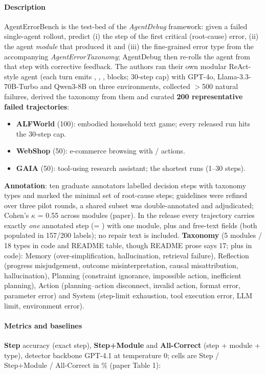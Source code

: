 \paragraph{Description} AgentErrorBench is the test-bed of the \emph{AgentDebug} framework: given a failed single-agent rollout, predict (i) the step of the first critical (root-cause) error, (ii) the agent \emph{module} that produced it and (iii) the fine-grained error type from the accompanying \emph{AgentErrorTaxonomy}; AgentDebug then re-rolls the agent from that step with corrective feedback. The authors ran their own modular ReAct-style agent (each turn emits , , ,  blocks; 30-step cap) with GPT-4o, Llama-3.3-70B-Turbo and Qwen3-8B on three environments, collected $>$500 natural failures, derived the taxonomy from them and curated \textbf{200 representative failed trajectories}:
\begin{itemize}
\item \textbf{ALFWorld} (100): embodied household text game; every released run hits the 30-step cap.
\item \textbf{WebShop} (50): e-commerce browsing with  /  actions.
\item \textbf{GAIA} (50): tool-using research assistant; the shortest runs (1--30 steps).
\end{itemize}
\textbf{Annotation}: ten graduate annotators labelled decision steps with taxonomy types and marked the minimal set of root-cause steps; guidelines were refined over three pilot rounds, a shared subset was double-annotated and adjudicated; Cohen's $\kappa$ = 0.55 across modules (paper). In the release every trajectory carries exactly \emph{one} annotated step (= ) with one module, plus  and free-text  fields (both populated in 157/200 labels); no repair text is included. \textbf{Taxonomy} (5 modules / 18 types in code and README table, though README prose says 17; plus  in code): Memory (over-simplification, hallucination, retrieval failure), Reflection (progress misjudgement, outcome misinterpretation, causal misattribution, hallucination), Planning (constraint ignorance, impossible action, inefficient planning), Action (planning--action disconnect, invalid action, format error, parameter error) and System (step-limit exhaustion, tool execution error, LLM limit, environment error).

\paragraph{Metrics and baselines} \textbf{Step} accuracy (exact step), \textbf{Step+Module} and \textbf{All-Correct} (step + module + type), detector backbone GPT-4.1 at temperature 0; cells are Step / Step+Module / All-Correct in \% (paper Table 1):


